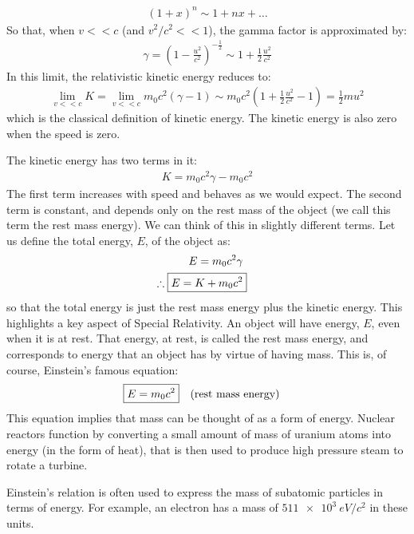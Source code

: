 \begin{align*}
(1+x)^n\sim 1 + nx +\dots 
\end{align*}
So that, when $v<<c$ (and $v^2/c^2<<1$), the gamma factor is approximated by:
\begin{align*}
\gamma=\left(1-\frac{u^2}{c^2}\right)^{-\frac{1}{2}}\sim 1+\frac{1}{2}\frac{u^2}{c^2}
\end{align*}
In this limit, the relativistic kinetic energy reduces to:
\begin{align*}
\lim_{v<<c}K=\lim_{v<<c}m_0c^2(\gamma -1)\sim m_0c^2\left(1+\frac{1}{2}\frac{u^2}{c^2} - 1  \right)=\frac{1}{2}mu^2
\end{align*}
which is the classical definition of kinetic energy. The kinetic energy is also zero when the speed is zero.

The kinetic energy has two terms in it:
\begin{align*}
K=m_0c^2\gamma -m_0c^2
\end{align*}
The first term increases with speed and behaves as we would expect. The second term is constant, and depends only on the rest mass of the object (we call this term the rest mass energy). We can think of this in slightly different terms. Let us define the total energy, $E$, of the object as:
\begin{align*}
E=m_0c^2\gamma\\
\therefore \;\Aboxed{E = K+m_0c^2}
\end{align*}
so that the total energy is just the rest mass energy plus the kinetic energy. This highlights a key aspect of Special Relativity. An object will have energy, $E$, even when it is at rest. That energy, at rest, is called the rest mass energy, and corresponds to energy that an object has by virtue of having mass. This is, of course, Einstein's famous equation:
\begin{align*}
\Aboxed{E=m_0c^2}\quad \text{(rest mass energy)}
\end{align*}
This equation implies that mass can be thought of as a form of energy. Nuclear reactors function by converting a small amount of mass of uranium atoms into energy (in the form of heat), that is then used to produce high pressure steam to rotate a turbine.

Einstein's relation is often used to express the mass of subatomic particles in terms of energy. For example, an electron has a mass of $\SI{511e3}{eV/c^2}$ in these units. 

